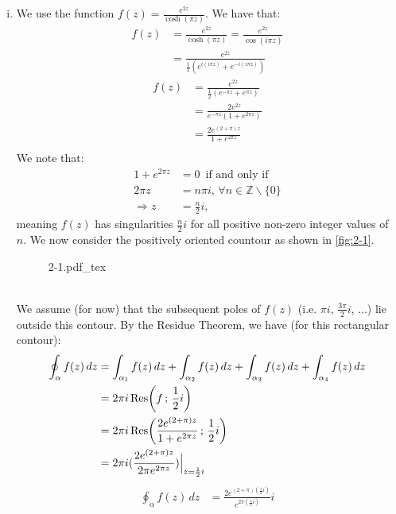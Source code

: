 \documentclass[letterpaper, titlepage, DIV=14]{scrartcl}
\newcommand{\incfig}[1]{%
    \def\svgwidth{0.75\columnwidth}
    {#1.pdf_tex}
}
\begin{document}
\begin{enumerate}[i)]
      \item 
      We use the function $f(z) = \frac{e^{2z}}{\cosh(\pi z)}$. We have that:
      \begin{align*}
        f(z) &= \frac{e^{2z}}{\cosh(\pi z)} = \frac{e^{2z}}{\cos(i\pi z)} \\
          &= \frac{e^{2z}}{\frac{1}{2}(e^{i(i\pi z)} + e^{-i(i\pi z)})}
      \end{align*}
      \begin{align*}
        f(z) &= \frac{e^{2z}}{\frac{1}{2}(e^{-\pi z} + e^{\pi z})} \\
          &= \frac{2e^{2z}}{e^{-\pi z}(1 + e^{2\pi z})} \\
          &= \frac{2e^{(2+\pi)z}}{1 + e^{2\pi z}} \\
      \end{align*}
      We note that:
      \begin{align*}
        1 + e^{2\pi z} &= 0 \,  \text{ if and only if} \\
        2\pi z &= n\pi i, \, \forall n \in \mathbb{Z}\backslash\{0\} \\
        \Rightarrow z &= \frac{n}{2}i,
      \end{align*} meaning $f(z)$ has singularities $\frac{n}{2}i$ for all positive non-zero integer values of $n$. We now consider the positively oriented countour as shown in \autoref{fig:2-1}.
      \begin{figure}[!h]
        \centering
        \incfig{2-1}
        \caption{}
        \label{fig:2-1}
    \end{figure} \\
    We assume (for now) that the subsequent poles of $f(z)$ (i.e. $\pi i$, $\frac{3\pi}{2}i$, $\ldots$) lie outside this contour. By the Residue Theorem, we have (for this rectangular contour):
    \begin{align*}
      \oint_{\alpha} f(z) \, dz &= \int_{\alpha_{1}} f(z) \, dz + \int_{\alpha_{2}} f(z) \, dz + \int_{\alpha_{3}} f(z) \, dz + \int_{\alpha_{4}} f(z) \, dz \\
        &= 2\pi i \Res(f \, ; \, \frac{1}{2} i) \\
        &= 2\pi i \Res(\frac{2e^{(2+\pi)z}}{1 + e^{2\pi z}} \, ; \, \frac{1}{2} i) \\
        &= 2\pi i (\frac{2e^{(2+\pi)z}}{2\pi e^{2\pi z}})\Big|_{z=\frac{1}{2} i} \\
    \end{align*}
    \begin{align*}
      \oint_{\alpha} f(z) \, dz &= \frac{2e^{(2+\pi)(\frac{1}{2} i)}}{e^{2\pi(\frac{1}{2} i)}} i \\

\end{align*}
\end{enumerate}
\end{document}
